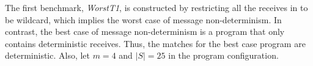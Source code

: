 The first benchmark, \textit{WorstT1}, is constructed by restricting all the receives in  to be wildcard, which implies the worst case of message non-determinism. In contrast, the best case of message non-determinism is a program that only contains deterministic receives. Thus, the matches for the best case program are deterministic. Also, let $m=4$ and $|S| = 25$ in the program configuration. 

